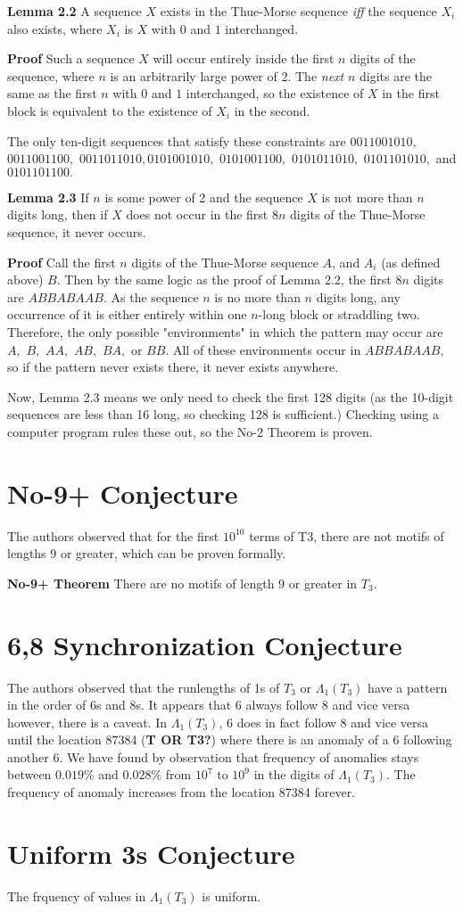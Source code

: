 \documentclass{article}
\begin{document}
\textbf{Lemma 2.2} A sequence $X$ exists in the Thue-Morse sequence \emph{iff} the sequence $X_i$ also exists, where $X_i$ is $X$ with $0$ and $1$ interchanged.

\textbf{Proof} Such a sequence $X$ will occur entirely inside the first $n$ digits of the sequence, where $n$ is an arbitrarily large power of 2. The \emph{next} $n$ digits are the same as the first $n$ with $0$ and $1$ interchanged, so the existence of $X$ in the first block is equivalent to the existence of $X_i$ in the second.

The only ten-digit sequences that satisfy these constraints are $0011001010,$ $0011001100,$ $0011011010,$$0101001010,$ $0101001100,$ $0101011010,$ $0101101010,$ and $0101101100.$

\textbf{Lemma 2.3} If $n$ is some power of 2 and the sequence $X$ is not more than $n$ digits long, then if $X$ does not occur in the first $8n$ digits of the Thue-Morse sequence, it never occurs.

\textbf{Proof} Call the first $n$ digits of the Thue-Morse sequence $A$, and $A_i$ (as defined above) $B.$ Then by the same logic as the proof of Lemma 2.2, the first $8n$ digits are $ABBABAAB.$ As the sequence $n$ is no more than $n$ digits long, any occurrence of it is either entirely within one $n$-long block or straddling two. Therefore, the only possible "environments" in which the pattern may occur are $A,$ $B,$ $AA,$ $AB,$ $BA,$ or $BB.$ All of these environments occur in $ABBABAAB,$ so if the pattern never exists there, it never exists anywhere.

Now, Lemma 2.3 means we only need to check the first 128 digits (as the 10-digit sequences are less than 16 long, so checking 128 is sufficient.) Checking using a computer program rules these out, so the No-2 Theorem is proven.


\section{No-9+ Conjecture}
The authors observed that for the first $10^{10}$ terms of T3, there are not motifs of lengths 9 or greater, which can be proven formally.

\textbf{No-9+ Theorem} There are no motifs of length $9$ or greater in $T_3$.

\section{6,8 Synchronization Conjecture}
The authors observed that the runlengths of 1s of $T_3$ or $\Lambda{_1(T_3)}$ have a pattern in the order of 6s and 8s. It appears that 6 always follow 8 and vice versa however, there is a caveat. In $\Lambda{_1(T_3)}$, 6 does in fact follow 8 and vice versa until the location 87384 (\textbf{T OR T3?}) where there is an anomaly of a 6 following another 6. We have found by observation that frequency of anomalies stays between $0.019\%$ and $0.028\%$ from $10^7$ to $10^9$ in the digits of $\Lambda{_1(T_3)}$. The frequency of anomaly increases from the location 87384 forever.

\section{Uniform 3s Conjecture}
The frquency of values in $\Lambda{_1(T_3)}$ is uniform.
\end{document}

